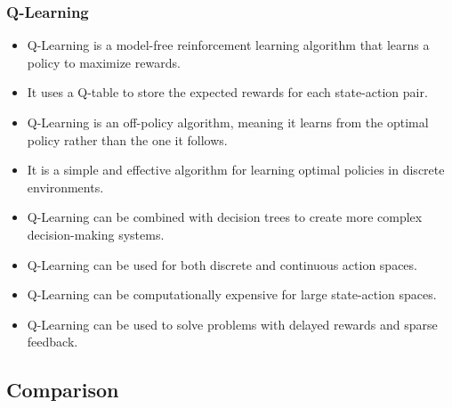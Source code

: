 \subsubsection{Q-Learning}
\begin{itemize}
    \item Q-Learning is a model-free reinforcement learning algorithm that learns a policy to maximize rewards.
    \item It uses a Q-table to store the expected rewards for each state-action pair.
    \item Q-Learning is an off-policy algorithm, meaning it learns from the optimal policy rather than the one it follows.
    \item It is a simple and effective algorithm for learning optimal policies in discrete environments.
    \item Q-Learning can be combined with decision trees to create more complex decision-making systems.
    \item Q-Learning can be used for both discrete and continuous action spaces.
    \item Q-Learning can be computationally expensive for large state-action spaces.
    \item Q-Learning can be used to solve problems with delayed rewards and sparse feedback.
\end{itemize}

\subsection{Comparison}

